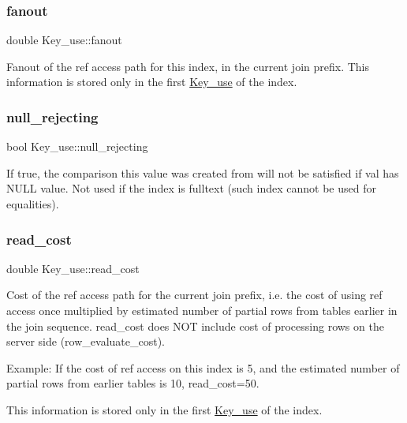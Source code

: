 \subsubsection{\texorpdfstring{fanout}{fanout}}
{\footnotesize\ttfamily double Key\+\_\+use\+::fanout}

Fanout of the ref access path for this index, in the current join prefix. This information is stored only in the first \mbox{\hyperlink{classKey__use}{Key\+\_\+use}} of the index. \mbox{\label{classKey__use_acba461fa75819da0303af030700a8d5b}} 
\subsubsection{\texorpdfstring{null\+\_\+rejecting}{null\_rejecting}}
{\footnotesize\ttfamily bool Key\+\_\+use\+::null\+\_\+rejecting}

If true, the comparison this value was created from will not be satisfied if val has N\+U\+LL \textquotesingle{}value\textquotesingle{}. Not used if the index is fulltext (such index cannot be used for equalities). \mbox{\label{classKey__use_a48b5e41c710a57dd77c0da56d1666e8c}} 
\subsubsection{\texorpdfstring{read\+\_\+cost}{read\_cost}}
{\footnotesize\ttfamily double Key\+\_\+use\+::read\+\_\+cost}

Cost of the ref access path for the current join prefix, i.\+e. the cost of using ref access once multiplied by estimated number of partial rows from tables earlier in the join sequence. read\+\_\+cost does N\+OT include cost of processing rows on the server side (row\+\_\+evaluate\+\_\+cost).

Example\+: If the cost of ref access on this index is 5, and the estimated number of partial rows from earlier tables is 10, read\+\_\+cost=50.

This information is stored only in the first \mbox{\hyperlink{classKey__use}{Key\+\_\+use}} of the index. \mbox{\label{classKey__use_a72971098712c22d6ab436e02a66837d4}} 
